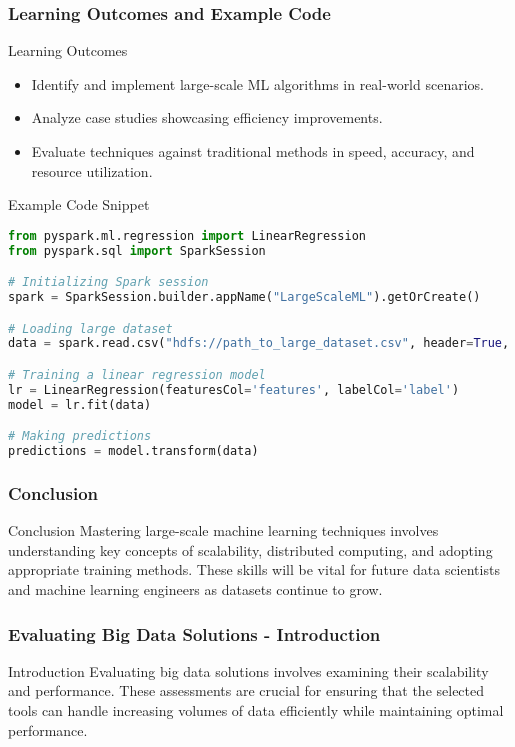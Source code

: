 \documentclass[aspectratio=169]{beamer}
\begin{document}
\begin{frame}[fragile]
    \frametitle{Learning Outcomes and Example Code}
    \begin{block}{Learning Outcomes}
        \begin{itemize}
            \item Identify and implement large-scale ML algorithms in real-world scenarios.
            \item Analyze case studies showcasing efficiency improvements.
            \item Evaluate techniques against traditional methods in speed, accuracy, and resource utilization.
        \end{itemize}
    \end{block}

    \begin{block}{Example Code Snippet}
        \begin{lstlisting}[language=Python]
from pyspark.ml.regression import LinearRegression
from pyspark.sql import SparkSession

# Initializing Spark session
spark = SparkSession.builder.appName("LargeScaleML").getOrCreate()

# Loading large dataset
data = spark.read.csv("hdfs://path_to_large_dataset.csv", header=True, inferSchema=True)

# Training a linear regression model
lr = LinearRegression(featuresCol='features', labelCol='label')
model = lr.fit(data)

# Making predictions
predictions = model.transform(data)
        \end{lstlisting}
    \end{block}
\end{frame}

\begin{frame}[fragile]
    \frametitle{Conclusion}
    \begin{block}{Conclusion}
        Mastering large-scale machine learning techniques involves understanding key concepts of scalability, distributed computing, and adopting appropriate training methods. These skills will be vital for future data scientists and machine learning engineers as datasets continue to grow.
    \end{block}
\end{frame}

\begin{frame}[fragile]
  \frametitle{Evaluating Big Data Solutions - Introduction}
  \begin{block}{Introduction}
    Evaluating big data solutions involves examining their scalability and performance. 
    These assessments are crucial for ensuring that the selected tools can handle increasing 
    volumes of data efficiently while maintaining optimal performance.
  \end{block}
\end{frame}
\end{document}
